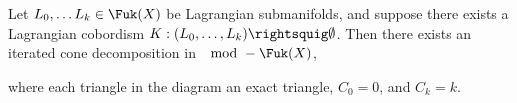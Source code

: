 
Let $L_0, \ldots L_k\in \Fuk(X)$ be Lagrangian submanifolds, and suppose there exists a Lagrangian cobordism $K: (L_0, \ldots, L_k)\rightsquig \emptyset$. Then there exists an iterated cone decomposition in $\mod-\Fuk(X)$,

where each triangle in the diagram an exact triangle, $C_0=0$, and $C_k=k$.
